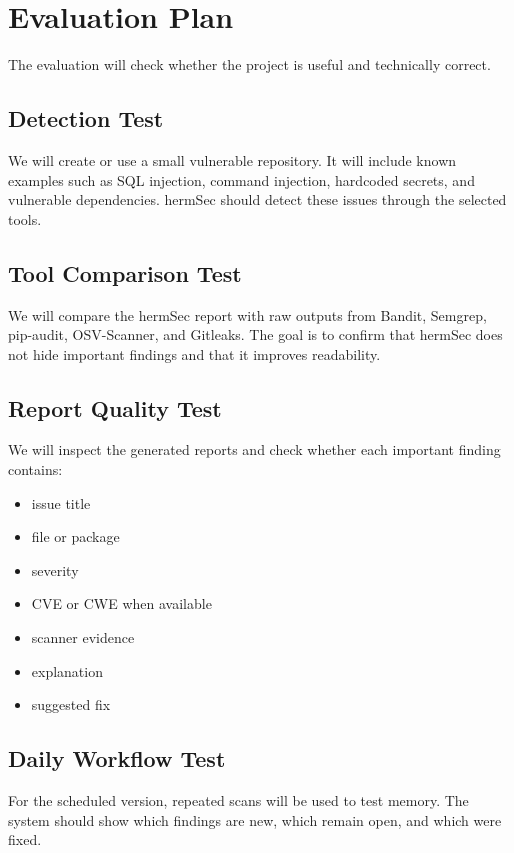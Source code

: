 \documentclass[
    numbers=noenddot,
    parskip=half-,
    fontsize=11pt,
    paper=a4,
    oneside,
    titlepage,
    bibliography=totoc,
    chapterprefix=false
]{scrbook}
\begin{document}
\chapter{Evaluation Plan}

The evaluation will check whether the project is useful and technically correct.

\section{Detection Test}

We will create or use a small vulnerable repository. It will include known examples such as SQL injection, command injection, hardcoded secrets, and vulnerable dependencies. hermSec should detect these issues through the selected tools.

\section{Tool Comparison Test}

We will compare the hermSec report with raw outputs from Bandit, Semgrep, pip-audit, OSV-Scanner, and Gitleaks. The goal is to confirm that hermSec does not hide important findings and that it improves readability.

\section{Report Quality Test}

We will inspect the generated reports and check whether each important finding contains:

\begin{itemize}
    \item issue title
    \item file or package
    \item severity
    \item CVE or CWE when available
    \item scanner evidence
    \item explanation
    \item suggested fix
\end{itemize}

\section{Daily Workflow Test}

For the scheduled version, repeated scans will be used to test memory. The system should show which findings are new, which remain open, and which were fixed.
\end{document}
